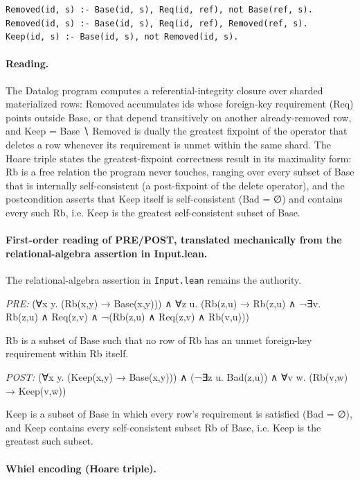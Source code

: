 \documentclass[10pt]{article}
\begin{document}
\begin{Verbatim}[fontsize=\scriptsize,breaklines=true,breakanywhere=true,frame=single,framesep=1.5mm]
Removed(id, s) :- Base(id, s), Req(id, ref), not Base(ref, s).
Removed(id, s) :- Base(id, s), Req(id, ref), Removed(ref, s).
Keep(id, s) :- Base(id, s), not Removed(id, s).
\end{Verbatim}

\paragraph{Reading.} The Datalog program computes a referential-integrity closure over sharded materialized rows: Removed accumulates ids whose foreign-key requirement (Req) points outside Base, or that depend transitively on another already-removed row, and Keep = Base ∖ Removed is dually the greatest fixpoint of the operator that deletes a row whenever its requirement is unmet within the same shard. The Hoare triple states the greatest-fixpoint correctness result in its maximality form: Rb is a free relation the program never touches, ranging over every subset of Base that is internally self-consistent (a post-fixpoint of the delete operator), and the postcondition asserts that Keep itself is self-consistent (Bad = ∅) and contains every such Rb, i.e. Keep is the greatest self-consistent subset of Base.

\paragraph{First-order reading of PRE/POST, translated mechanically from the relational-algebra assertion in Input.lean.} The relational-algebra assertion in \texttt{Input.lean} remains the authority.

\textit{PRE:} (∀x y. (Rb(x,y) → Base(x,y))) ∧ ∀z u. (Rb(z,u) → Rb(z,u) ∧ ¬∃v. Rb(z,u) ∧ Req(z,v) ∧ ¬(Rb(z,u) ∧ Req(z,v) ∧ Rb(v,u)))\par Rb is a subset of Base such that no row of Rb has an unmet foreign-key requirement within Rb itself.

\textit{POST:} (∀x y. (Keep(x,y) → Base(x,y))) ∧ (¬∃z u. Bad(z,u)) ∧ ∀v w. (Rb(v,w) → Keep(v,w))\par Keep is a subset of Base in which every row's requirement is satisfied (Bad = ∅), and Keep contains every self-consistent subset Rb of Base, i.e. Keep is the greatest such subset.

\paragraph{Whiel encoding (Hoare triple).}
\end{document}
